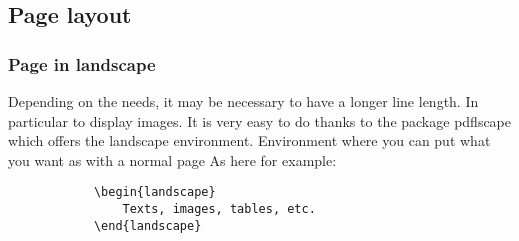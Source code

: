 \subsection{Page layout}

\begin{landscape}
    \subsubsection{Page in landscape}
    Depending on the needs, it may be necessary to have a longer line length. In particular to display images.
    It is very easy to do thanks to the package pdflscape which offers the landscape environment. Environment where you can put what you want as with a normal page
    As here for example:
    \begin{code}
        \begin{verbatim}
            \begin{landscape}
                Texts, images, tables, etc.
            \end{landscape}
    \end{verbatim}
        \caption{Use of landscape}
    \end{code}
\end{landscape}